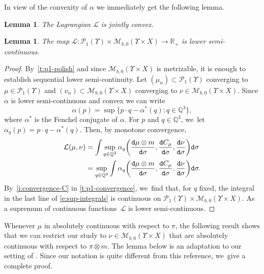 \documentclass[JEP,XML,SOM,Unicode,published]{cedram}
\newcommand{\real}{\mathbb{R}}
\newtheorem{lemma}[theorem]{Lemma}
\theoremstyle{definition}
\theoremstyle{remark}
\DeclarePairedDelimiter{\paren}{\lparen}{\rparen}
\begin{document}
In view of the convexity of $\alpha$ we immediately get the following lemma.
\begin{lemma}\label{t:convex-lagrangian}
The Lagrangian $\mathcal{L}$ is jointly convex.
\end{lemma}

\begin{lemma}\label{t:lsc-lagrangian}
The map $\mathcal{L} \colon \mathscr{P}_{1}(\varUpsilon) \times \mathscr{M}_{b,0}(\varUpsilon \times X) \to \real_{+}$ is lower semi-continuous.
\end{lemma}
\begin{proof}
By~\cref{t:p1-polish} and since $\mathscr{M}_{b,0}(\varUpsilon \times X)$ is metrizable, it is enough to establish sequential lower semi-continuity.
Let $(\mu_{n}) \subset \mathscr{P}_{1}(\varUpsilon)$ converging to $\mu \in \mathscr{P}_{1}(\varUpsilon)$ and $(\nu_{n}) \subset \mathscr{M}_{b,0}(\varUpsilon \times X)$ converging to $\nu \in \mathscr{M}_{b,0}(\varUpsilon \times X)$.
Since $\alpha$ is lower semi-continuous and convex we can write
\begin{equation*}
\alpha(p) = \sup \bigl\{ p \cdot q - \alpha^{*}(q) : q \in \mathbb{Q}^{3} \bigr\},
\end{equation*}
where $\alpha^{*}$ is the Fenchel conjugate of $\alpha$.
For $p$ and $q \in \mathbb{Q}^{3}$, we~let $\alpha_{q}(p) = p \cdot q - \alpha^{*}(q)$.
Then, by monotone convergence,
\begin{equation}
\begin{aligned}\label{e:sup-integrals}
\mathcal{L}(\mu, \nu) &= \int \sup_{q \in \mathbb{Q}^{3}} \alpha_{q}\paren*{\frac{\mathtt{d} \mu \otimes m}{\mathtt{d} \sigma}, \frac{\mathtt{d} C_{\mu}}{\mathtt{d} \sigma}, \frac{\mathtt{d} \nu}{\mathtt{d} \sigma}} \mathtt{d} \sigma \\
&= \sup_{q \in \mathbb{Q}^{3}} \int \alpha_{q}\paren*{\frac{\mathtt{d} \mu \otimes m}{\mathtt{d} \sigma}, \frac{\mathtt{d} C_{\mu}}{\mathtt{d} \sigma}, \frac{\mathtt{d} \nu}{\mathtt{d} \sigma}} \mathtt{d} \sigma.
\end{aligned}
\end{equation}
By~\cref{i:convergence-C} in \cref{t:p1-convergence}, we~find that, for $q$ fixed, the integral in the last line of \cref{e:sup-integrals} is continuous on $\mathscr{P}_{1}(\varUpsilon) \times \mathscr{M}_{b,0}(\varUpsilon \times X)$.
As a supremum of continuous functions~$\mathcal{L}$ is lower semi-continuous.
\end{proof}

Whenever $\mu$ in absolutely continuous with respect to $\pi$, the following result shows that we can restrict our study to $\nu \in \mathscr{M}_{b,0}(\varUpsilon \times X)$ that are absolutely continuous with respect to $\pi \otimes m$.
The lemma below is an adaptation to our setting of \cite[Lem.\,2.3]{Erbar}. Since our notation is quite different from this reference, we~give a complete proof.
\end{document}
